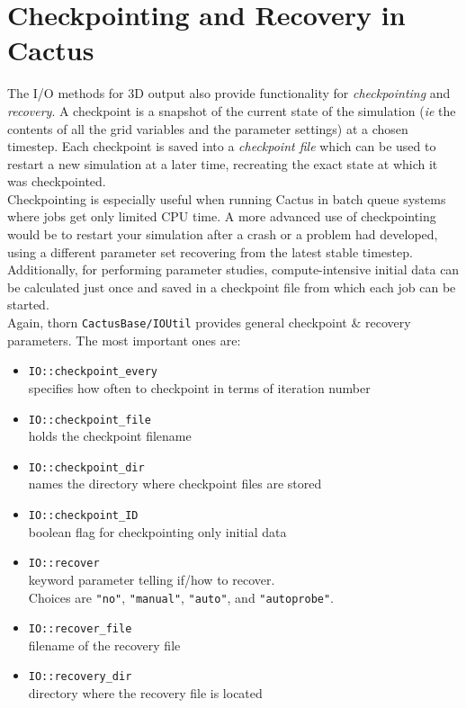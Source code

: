 \documentclass{article}
\begin{document}
\section{Checkpointing and Recovery in Cactus}

The I/O methods for 3D output also provide functionality for {\it checkpointing}
and {\it recovery}. A checkpoint is a snapshot of the current state of the 
simulation ({\it ie} the contents of all the grid variables and the parameter 
settings) at a chosen timestep. Each checkpoint is saved into a 
{\it checkpoint file} which can be used to restart a new simulation at a later
time, recreating the exact state at which it was checkpointed.\\
Checkpointing is especially useful when running Cactus in batch queue systems 
where jobs get only limited CPU time. A more advanced use of checkpointing 
would be to restart your simulation after a crash or a problem had developed,
using a  different parameter set recovering from the latest stable timestep. 
Additionally, for performing parameter studies,  compute-intensive
initial data can be calculated just once and saved in a checkpoint file 
from which each job can be started. \\

Again, thorn {\tt CactusBase/IOUtil} provides general checkpoint \& recovery
parameters. The most important ones are:
\begin{itemize}
  \item {\tt IO::checkpoint\_every}\\
    specifies how often to checkpoint in terms of iteration number
  \item {\tt IO::checkpoint\_file}\\
    holds the checkpoint filename
  \item {\tt IO::checkpoint\_dir}\\
    names the directory where checkpoint files are stored
  \item {\tt IO::checkpoint\_ID}\\
    boolean flag for checkpointing only initial data
  \item {\tt IO::recover}\\
    keyword parameter telling if/how to recover.\\
    Choices are {\tt "no"}, {\tt "manual"}, {\tt "auto"}, and {\tt "autoprobe"}.
  \item {\tt IO::recover\_file}\\
    filename of the recovery file
  \item {\tt IO::recovery\_dir}\\
    directory where the recovery file is located
\end{itemize}
\end{document}
